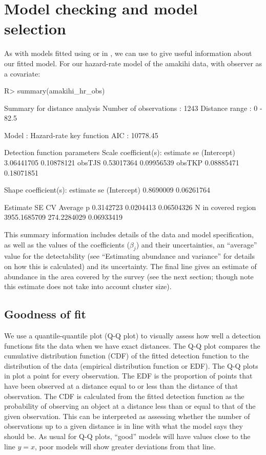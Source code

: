 \documentclass[article]{jss}\usepackage[]{graphicx}\usepackage[]{color}
\begin{document}
\section{Model checking and model selection}

As with models fitted using  or  in , we can use  to give useful information about our fitted model. For our hazard-rate model of the amakihi data, with observer as a covariate:
\begin{Schunk}
\begin{Sinput}
R> summary(amakihi_hr_obs)
\end{Sinput}
\begin{Soutput}

Summary for distance analysis 
Number of observations :  1243 
Distance range         :  0  -  82.5 

Model : Hazard-rate key function 
AIC   : 10778.45 

Detection function parameters
Scale coefficient(s):  
              estimate         se
(Intercept) 3.06441705 0.10878121
obsTJS      0.53017364 0.09956539
obsTKP      0.08885471 0.18071851

Shape coefficient(s):  
             estimate         se
(Intercept) 0.8690009 0.06261764

                        Estimate          SE         CV
Average p              0.3142723   0.0204413 0.06504326
N in covered region 3955.1685709 274.2284029 0.06933419
\end{Soutput}
\end{Schunk}
This summary information includes details of the data and model specification, as well as the values of the coefficients ($\beta_j$) and their uncertainties, an ``average'' value for the detectability (see ``Estimating abundance and variance'' for details on how this is calculated) and its uncertainty. The final line gives an estimate of abundance in the area covered by the survey (see the next section; though note this estimate does not take into account cluster size).


\subsection{Goodness of fit}

We use a quantile-quantile plot (Q-Q plot) to visually assess how well a detection functions fits the data when we have exact distances. The Q-Q plot compares the cumulative distribution function (CDF) of the fitted detection function to the distribution of the data (empirical distribution function or EDF). The Q-Q plots in  plot a point for every observation. The EDF is the proportion of points that have been observed at a distance equal to or less than the distance of that observation. The CDF is calculated from the fitted detection function as the probability of observing an object at a distance less than or equal to that of the given observation. This can be interpreted as assessing whether the number of observations up to a given distance is in line with what the model says they should be. As usual for Q-Q plots, ``good'' models will have values close to the line $y=x$, poor models will show greater deviations from that line.
\end{document}
